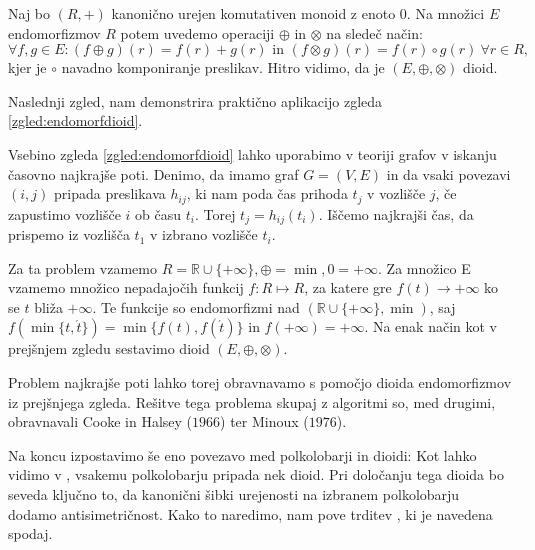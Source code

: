 \documentclass[mat1]{fmfdelo}
\newcommand{\R}{\mathbb{R}}
\begin{document}
\begin{zgled} \label{zgled:endomorfdioid}
	Naj bo $(R, +)$ kanonično urejen komutativen monoid z enoto $0$. Na množici $E$ endomorfizmov $R$ potem uvedemo operaciji $\oplus$ in $\otimes$ na sledeč način: $$\forall f, g \in E: (f\oplus g)(r) = f(r) + g(r) \text{~in~} (f\otimes g)(r) = f(r) \circ g(r) ~\forall r\in R,$$ kjer je $\circ$ navadno komponiranje preslikav. Hitro vidimo, da je $(E, \oplus, \otimes)$ dioid. 
\end{zgled}

Naslednji zgled, nam demonstrira praktično aplikacijo zgleda \ref{zgled:endomorfdioid}.

\begin{zgled}\label{zgled:shortpathdioid}
	Vsebino zgleda \ref{zgled:endomorfdioid} lahko uporabimo v teoriji grafov v iskanju časovno najkrajše poti. Denimo, da imamo graf $G = (V, E)$ in da vsaki povezavi $(i, j)$ pripada preslikava $h_{ij}$, ki nam poda čas prihoda $t_j$ v vozlišče $j$, če zapustimo vozlišče $i$ ob času $t_i$. Torej $ t_j = h_{ij}(t_i)$. Iščemo najkrajši čas, da prispemo iz vozlišča $t_1$ v izbrano vozlišče $t_i$.
	
	Za ta problem vzamemo $R = \R\cup\{+\infty\}, \oplus = \min, 0 = +\infty$. Za množico E vzamemo množico nepadajočih funkcij $f: R \mapsto R$, za katere gre $f(t) \to +\infty$ ko se $t$ bliža $+\infty$. Te funkcije so endomorfizmi nad $(\R\cup\{+\infty\}, \min)$, saj $f(\min\{t, \acute{t}\}) = \min\{f(t),f(\acute{t})\}$ in $f(+\infty) = +\infty$. Na enak način kot v prejšnjem zgledu sestavimo dioid $(E, \oplus, \otimes)$.
	
	Problem najkrajše poti lahko torej obravnavamo s pomočjo dioida endomorfizmov iz prejšnjega zgleda. Rešitve tega problema skupaj z algoritmi so, med drugimi, obravnavali Cooke in Halsey ($1966$) ter Minoux ($1976$).
\end{zgled}

Na koncu izpostavimo še eno povezavo med polkolobarji in dioidi: Kot lahko vidimo v \cite[poglavje 6.\,9.\,]{bib:Gondran}, vsakemu polkolobarju pripada nek dioid. Pri določanju tega dioida bo seveda ključno to, da kanonični šibki urejenosti na izbranem polkolobarju dodamo antisimetričnost. Kako to naredimo, nam pove trditev \cite[trditev 6.\,9.\,1.\,]{bib:Gondran}, ki je navedena spodaj.
\end{document}
